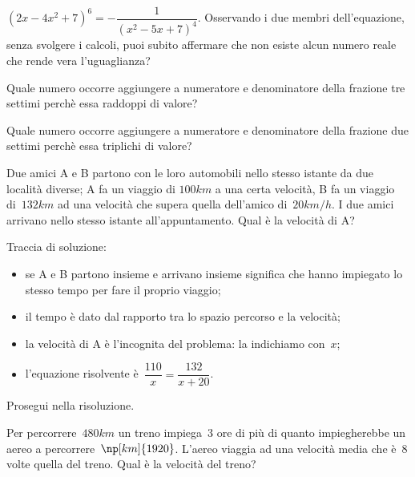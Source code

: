 \begin{esercizio}
\label{ese:20.29}
$\left(2x-4x^{2}+7\right)^{6}=-{\dfrac{1}{\left(x^{2}-5x+7\right)^{4}}}$. Osservando i due membri dell'equazione, senza svolgere i calcoli, puoi subito affermare che non esiste alcun numero reale che rende
vera l'uguaglianza?
\end{esercizio}

\begin{esercizio}[\Ast]
\label{ese:20.30}
Quale numero occorre aggiungere a numeratore e denominatore della frazione tre settimi perchè essa raddoppi di valore?
\end{esercizio}

\begin{esercizio}[\Ast]
\label{ese:20.31}
Quale numero occorre aggiungere a numeratore e denominatore della frazione due settimi perchè essa triplichi di valore?
\end{esercizio}

\begin{esercizio}
\label{ese:20.32}
Due amici A e B partono con le loro automobili nello stesso istante da due località diverse; A fa un viaggio di
$100\unit{km}$ a una certa velocità, B fa un viaggio di~$132\unit{km}$ ad una velocità che supera quella dell’amico di~$20\unit{km/h}$.
I due amici arrivano nello stesso istante all’appuntamento. Qual è la velocità di A?
\begin{center}
 
\end{center}
Traccia di soluzione:
\begin{itemize}
 \item se A e B partono insieme e arrivano insieme significa che hanno impiegato lo stesso tempo per fare il proprio viaggio;
 \item il tempo è dato dal rapporto tra lo spazio percorso e la velocità;
 \item la velocità di A è l’incognita del problema: la indichiamo con~$x$;
 \item l’equazione risolvente è~$\dfrac{110}{x}=\dfrac{132}{x+20}$.
\end{itemize}
Prosegui nella risoluzione.
\end{esercizio}

\begin{esercizio}
\label{ese:20.33}
Per percorrere~$480\unit{km}$ un treno impiega~$3$ ore di più di quanto impiegherebbe un aereo a percorrere~$\np[km]{1920}$.
L’aereo viaggia ad una velocità media che è~$8$ volte quella del treno. Qual è la velocità del treno?
\end{esercizio}


